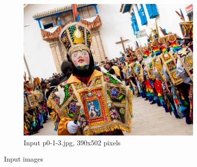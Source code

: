 \begin{figure}[h!]
\begin{subfigure}{0.5\textwidth}
\end{subfigure}%
\begin{subfigure}{0.5\textwidth}
  \centering
  \includegraphics[width=0.5\linewidth]{../input/p0-1-3.jpg}
  \caption{Input p0-1-3.jpg, 390x502 pixels}
  \label{fig:sfig2}
\end{subfigure}
 \caption{Input images}
\label{fig:Input-images}
\end{figure}
